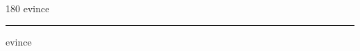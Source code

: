 
\begin{frame}
\begin{center}
\begin{turn}{180}
{\fontsize{2.5cm}{1em}\selectfont evince}
\end{turn}
\vspace{1em}\par  
\hrule
\vspace{1em}\par  
{\fontsize{2.5cm}{1em}\selectfont evince}
\end{center}
\end{frame}
